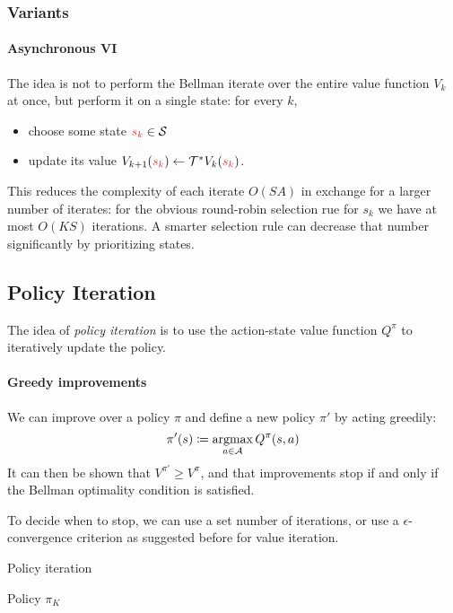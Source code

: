 \documentclass[../course-notes.tex]{subfiles}
\begin{document}
\subsubsection{Variants}

\paragraph{Asynchronous VI} The idea is not to perform the Bellman iterate over the entire value function $V_k$ at once, but perform it on a single state: for every $k$,
\begin{itemize}
	\item choose some state ${\redfont s_k} \in \calS$
	\item update its value $V_{k+1}({\redfont s_k}) \leftarrow \calT^*V_k({\redfont s_k})$.
\end{itemize}
This reduces the complexity of each iterate $O(SA)$ in exchange for a larger number of iterates: for the obvious round-robin selection rue for $s_k$ we have at most $O(KS)$ iterations. A smarter selection rule can decrease that number significantly by prioritizing states.




\subsection{Policy Iteration}

The idea of \textit{policy iteration} is to use the action-state value function $Q^\pi$ to iteratively update the policy.

\paragraph{Greedy improvements} We can improve over a policy $\pi$ and define a new policy $\pi'$ by acting greedily:
\[
	\pi'(s) \coloneqq \operatorname*{\mathrm{argmax}}_{a\in\mathcal{A}} Q^\pi(s,a)
\]
It can then be shown that $V^{\pi'} \geq V^{\pi}$, and that improvements stop if and only if the Bellman optimality condition is satisfied.

To decide when to stop, we can use a set number of iterations, or use a $\epsilon$-convergence criterion as suggested before for value iteration.

\begin{algorithm}\label{algo:PolicyIteration}
	\caption{Policy iteration}
	\Return Policy $\pi_K$\;
\end{algorithm}
\end{document}
